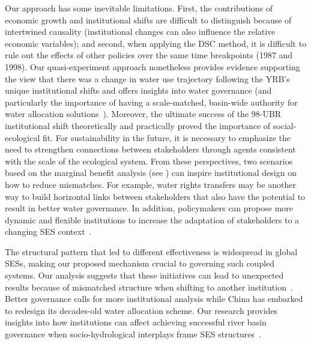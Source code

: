 Our approach has some inevitable limitations.
First, the contributions of economic growth and institutional shifts are difficult to distinguish because of intertwined causality (institutional changes can also influence the relative economic variables);
and second, when applying the DSC method, it is difficult to rule out the effects of other policies over the same time breakpoints (1987 and 1998).
Our quasi-experiment approach nonetheless provides evidence supporting the view that there was a change in water use trajectory following the YRB's unique institutional shifts and offers insights into water governance (and particularly the importance of having a scale-matched, basin-wide authority for water allocation solutions~\cite{bodin2017b, ostrom2009, reyers2018}).
Moreover, the ultimate success of the 98-UBR institutional shift theoretically and practically proved the importance of social-ecological fit.
For sustainability in the future, it is necessary to emphasize the need to strengthen connections between stakeholders through agents consistent with the scale of the ecological system.
From these perspectives, two scenarios based on the marginal benefit analysis (see \textit{}) can inspire institutional design on how to reduce mismatches.
For example, water rights transfers may be another way to build horizontal links between stakeholders that also have the potential to result in better water governance.
In addition, policymakers can propose more dynamic and flexible institutions to increase the adaptation of stakeholders to a changing SES context~\cite{reyers2018}.

The structural pattern that led to different effectiveness is widespread in global SESs, making our proposed mechanism crucial to governing such coupled systems.
Our analysis suggests that these initiatives can lead to unexpected results because of mismatched structure when shifting to another institution~\cite{bodin2017b}.
Better governance calls for more institutional analysis while China has embarked to redesign its decades-old water allocation scheme.
Our research provides insights into how institutions can affect achieving successful river basin governance when socio-hydrological interplays frame SES structures~\cite{muneepeerakul2017, leslie2015, hegwood2022}.
